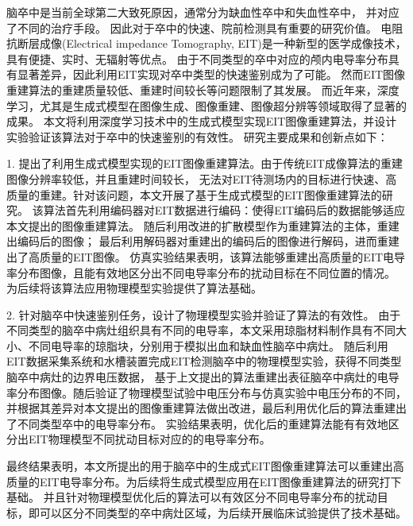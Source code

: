 
\begin{chineseabstract}

    脑卒中是当前全球第二大致死原因，通常分为缺血性卒中和失血性卒中，
    并对应了不同的治疗手段。
    因此对于卒中的快速、院前检测具有重要的研究价值。
    电阻抗断层成像(Electrical impedance Tomography, EIT)是一种新型的医学成像技术，具有便捷、实时、无辐射等优点。
    由于不同类型的卒中对应的颅内电导率分布具有显著差异，因此利用EIT实现对卒中类型的快速鉴别成为了可能。
    然而EIT图像重建算法的重建质量较低、重建时间较长等问题限制了其发展。
    而近年来，深度学习，尤其是生成式模型在图像生成、图像重建、图像超分辨等领域取得了显著的成果。
    本文将利用深度学习技术中的生成式模型实现EIT图像重建算法，并设计实验验证该算法对于卒中的快速鉴别的有效性。
    研究主要成果和创新点如下：

    1. 提出了利用生成式模型实现的EIT图像重建算法。由于传统EIT成像算法的重建图像分辨率较低，并且重建时间较长，
    无法对EIT待测场内的目标进行快速、高质量的重建。针对该问题，本文开展了基于生成式模型的EIT图像重建算法的研究。
    该算法首先利用编码器对EIT数据进行编码：使得EIT编码后的数据能够适应本文提出的图像重建算法。
    随后利用改进的扩散模型作为重建算法的主体，重建出编码后的图像；
    最后利用解码器对重建出的编码后的图像进行解码，进而重建出了高质量的EIT图像。
    仿真实验结果表明，该算法能够重建出高质量的EIT电导率分布图像，且能有效地区分出不同电导率分布的扰动目标在不同位置的情况。
    为后续将该算法应用物理模型实验提供了算法基础。
    

    2. 针对脑卒中快速鉴别任务，设计了物理模型实验并验证了算法的有效性。
    由于不同类型的脑卒中病灶组织具有不同的电导率，本文采用琼脂材料制作具有不同大小、不同电导率的琼脂块，分别用于模拟出血和缺血性脑卒中病灶。
    随后利用EIT数据采集系统和水槽装置完成EIT检测脑卒中的物理模型实验，获得不同类型脑卒中病灶的边界电压数据，
    基于上文提出的算法重建出表征脑卒中病灶的电导率分布图像。随后验证了物理模型试验中电压分布与仿真实验中电压分布的不同，
    并根据其差异对本文提出的图像重建算法做出改进，最后利用优化后的算法重建出了不同类型卒中的电导率分布。
    实验结果表明，优化后的重建算法能有有效地区分出EIT物理模型不同扰动目标对应的的电导率分布。
    
    最终结果表明，本文所提出的用于脑卒中的生成式EIT图像重建算法可以重建出高质量的EIT电导率分布。为后续将生成式模型应用在EIT图像重建算法的研究打下基础。
    并且针对物理模型优化后的算法可以有效区分不同电导率分布的扰动目标，即可以区分不同类型的卒中病灶区域，为后续开展临床试验提供了技术基础。






\end{chineseabstract}

